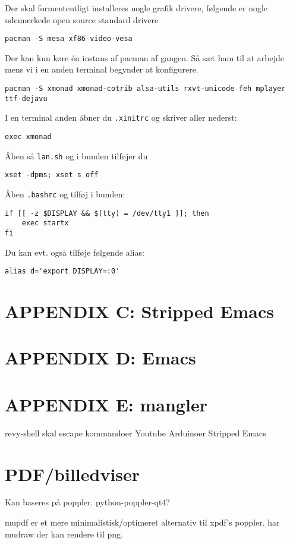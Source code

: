 \documentclass[10pt,a4paper,danish]{article}
\begin{document}
Der skal formententligt installeres nogle grafik drivere, følgende er nogle
udemærkede open source standard drivere

\begin{verbatim}
pacman -S mesa xf86-video-vesa
\end{verbatim}

Der kan kun køre én instans af pacman af gangen.
Så sæt ham til at arbejde mens vi i en anden terminal begynder at konfigurere.
\begin{verbatim}
pacman -S xmonad xmonad-cotrib alsa-utils rxvt-unicode feh mplayer ttf-dejavu
\end{verbatim}

I en terminal anden åbner du \texttt{.xinitrc} og skriver aller nederst:
\begin{verbatim}
exec xmonad
\end{verbatim}

Åben så \texttt{lan.sh} og i bunden tilføjer du
\begin{verbatim}
xset -dpms; xset s off
\end{verbatim}

Åben \texttt{.bashrc} og tilføj i bunden:
\begin{verbatim}
if [[ -z $DISPLAY && $(tty) = /dev/tty1 ]]; then
    exec startx
fi
\end{verbatim}
Du kan evt. også tilføje følgende alias:
\begin{verbatim}
alias d='export DISPLAY=:0'
\end{verbatim}

\section{APPENDIX C: Stripped Emacs}
\section{APPENDIX D: Emacs}
\section{APPENDIX E: mangler}
revy-shell skal escape kommandoer
Youtube
Arduinoer
Stripped Emacs


\section{PDF/billedviser}
Kan baseres på poppler.
python-poppler-qt4?

mupdf er et mere minimalistisk/optimeret alternativ til xpdf's poppler.
har mudraw der kan rendere til png.
\end{document}
